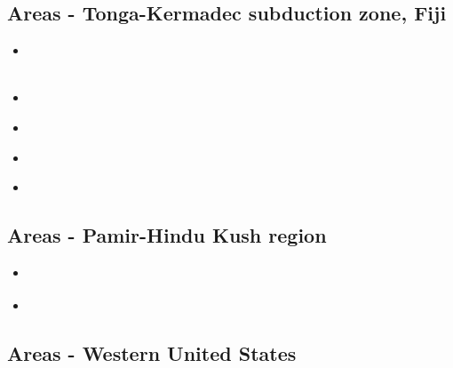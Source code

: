 \subsection{Areas - Tonga-Kermadec subduction zone, Fiji }

\begin{scriptsize}
\begin{itemize}
\item[\twothousandthree] 
\textcite{bigs03} \\
\textcite{bigu03} \\
\item[\twothousandsix] 
\textcite{zhpy06} \\
\item[\twothousandsixteen] 
\textcite{chff16} \\
\item[\twothousandseventeen] 
\textcite{wewv17} \\
\item[\twothousandtwentyone] 
\textcite{ligl21} 
\end{itemize}
\end{scriptsize}

\subsection{Areas - Pamir-Hindu Kush region}

\begin{scriptsize}
\begin{itemize}
\item[\twothousandseven]
\textcite{nerv07} 
\item[\twothousandsixteen]
\textcite{schr16} 
\end{itemize}
\end{scriptsize}


\subsection{Areas - Western United States}

